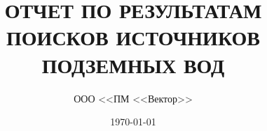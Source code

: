 


\author{ООО <<ПМ <<Вектор>>}\label{company}
\title{ОТЧЕТ ПО РЕЗУЛЬТАТАМ ПОИСКОВ ИСТОЧНИКОВ ПОДЗЕМНЫХ ВОД}
\date{\today}
\newcommand{\txtExecutor}{ООО <<ПМ <<Вектор>>}	%
\newcommand{\txtYear}{2026}						%
\newcommand{\txtAddress}{{ ADDRESS }}			%
\newcommand{\txtCadaster}{{ CADASTER }} 		%
\newcommand{\txtNomenclature}{{ NOMENCLATURE }}	%
\newcommand{\txtPhoneNumber}{{ PHONE }}	%


